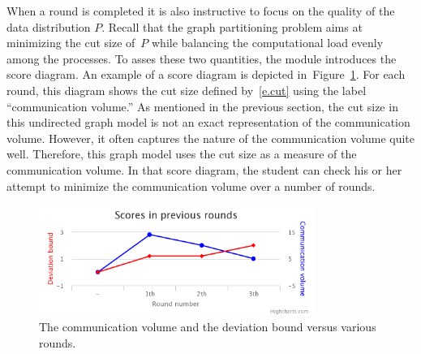 \documentclass[12pt, oneside]{book}
\newcommand{\figref}[1]{Figure~\protect\ref{#1}}
\begin{document}
When a round is completed it is also instructive to focus on the quality of the data
distribution $P$. Recall that the graph partitioning problem aims at minimizing the cut
size of~$P$ while balancing the computational load evenly among the processes. To asses
these two quantities, the module introduces the score diagram. An example of a score
diagram is depicted in~\figref{f.score}. For each round, this diagram shows the cut size
defined by~\eqref{e.cut} using the label ``communication volume.'' As mentioned in the
previous section, the cut size in this undirected graph model is not an exact
representation of the communication volume. However, it often captures the nature of the
communication volume quite well. Therefore, this graph model uses the cut size as a
measure of the communication volume. In that score diagram, the student can check his or
her attempt to minimize the communication volume over a number of rounds.

\begin{figure}
\centering
\includegraphics[width=0.8\textwidth]{chart}
\caption{The communication volume and the deviation bound versus various rounds.}
\label{f.score}
\end{figure}
\end{document}
